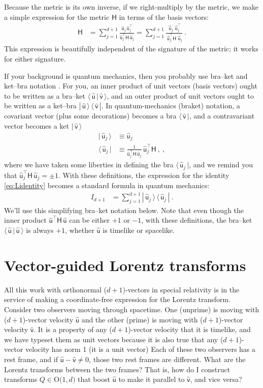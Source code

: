 \documentclass{article}
\newcommand{\metric}{\mathsf{H}}
\newcommand\upvec[1]{\!\vec{\,\mathrm{#1}}}
\newcommand{\Lvec}[1]{\upvec{\mathsf{#1}}} %
\newcommand{\Lhat}[1]{\hat{\mathsf{#1}}} %
\newcommand{\bra}[1]{\langle\,{#1}\,|}
\newcommand{\ket}[1]{|\,{#1}\,\rangle}
\newcommand{\braket}[2]{\langle\,{#1}\,|\,{#2}\,\rangle}
\newcommand{\ketbra}[2]{|\,{#1}\,\rangle\,\langle\,{#2}\,|}
\newcommand{\plus}{\!+\!} %
\begin{document}
Because the metric is its own inverse, if we right-multiply by the metric, we make a simple expression for the metric $\metric$ in terms of the basis vectors:
\begin{align}
    \metric &= \sum_{j=1}^{d+1} \frac{\Lhat{u}_j\,\Lhat{u}_j^\top}{\Lhat{u}_j^\top\metric\,\Lhat{u}_j} = \sum_{j=1}^{d+1} \frac{\Lvec{u}_j\,\Lvec{u}_j^\top}{\Lvec{u}_j^\top\metric\,\Lvec{u}_j} ~.
\end{align}
This expression is beautifully independent of the signature of the metric; it works for either signature.

If your background is quantum mechanics, then you probably use bra--ket and ket--bra notation \cite{dirac}.
For you, an inner product of unit vectors (basis vectors) ought to be written as a bra--ket $\braket{\Lhat{u}}{\Lhat{v}}$, and an outer product of unit vectors ought to be written as a ket--bra $\ketbra{\Lhat{u}}{\Lhat{v}}$.
In quantum-mechanics (braket) notation, a covariant vector (plus some decorations) becomes a bra $\bra{\Lhat{v}}$, and a contravariant vector becomes a ket $\ket{\Lhat{v}}$
\begin{align}
    \ket{\Lhat{u}_j} &\equiv \Lhat{u}_j \label{eq:Lket}\\
    \bra{\Lhat{u}_j} &\equiv \frac{1}{\Lhat{u}_j^\top\metric\,\Lhat{u}_j}\,\Lhat{u}_j^\top\metric ~,\label{eq:Lbra} ~,
\end{align}
where we have taken some liberties in defining the bra $\bra{\Lhat{u}_j}$, and we remind you that $\Lhat{u}_j^\top\metric\,\Lhat{u}_j=\pm 1$.
With these definitions, the expression for the identity \eqref{eq:Lidentity} becomes a standard formula in quantum mechanics:
\begin{align}
    I_{d+1} &= \sum_{j=1}^{d+1} \ketbra{\Lhat{u}_j}{\Lhat{u}_j} \label{eq:LidentityQM} ~.
\end{align}
We'll use this simplifying bra--ket notation below.
Note that even though the inner product $\Lhat{u}^\top\metric\,\Lhat{u}$ can be either $+1$ or $-1$, with these definitions, the bra--ket $\braket{\Lhat{u}}{\Lhat{u}}$ is always $+1$, whether $\Lhat{u}$ is timelike or spacelike.

\section{Vector-guided Lorentz transforms}\label{sec:lt}

All this work with orthonormal ($d\plus1$)-vectors in special relativity is in the service of making a coordinate-free expression for the Lorentz transform.
Consider two observers moving through spacetime.
One (unprime) is moving with ($d\plus1$)-vector velocity $\Lhat{u}$ and the other (prime) is moving with ($d\plus1$)-vector velocity $\Lhat{v}$.
It is a property of any ($d\plus1$)-vector velocity that it is timelike, and we have typeset them as unit vectors because it is also true that any ($d\plus1$)-vector velocity has norm 1 (it is a unit vector)
Each of these two observers has a rest frame, and if $\Lhat{u}-\Lhat{v}\neq 0$, those two rest frames are different.
What are the Lorentz transforms between the two frames?
That is, how do I construct transforms $Q\in\mbox{O($1,d$)}$ that boost $\Lhat{u}$ to make it parallel to $\Lhat{v}$, and vice versa?
\end{document}
